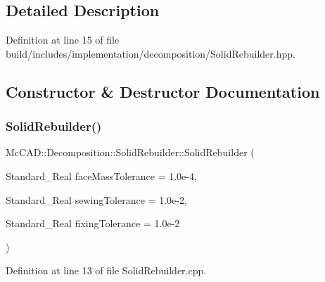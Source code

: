 \subsection{Detailed Description}


Definition at line 15 of file build/includes/implementation/decomposition/\+Solid\+Rebuilder.\+hpp.



\subsection{Constructor \& Destructor Documentation}
\mbox{\label{classMcCAD_1_1Decomposition_1_1SolidRebuilder_a44d8d2538e3297c5c8b843a6e5aa130d}} 
\subsubsection{\texorpdfstring{Solid\+Rebuilder()}{SolidRebuilder()}\hspace{0.1cm}{\footnotesize\ttfamily [1/2]}}
{\footnotesize\ttfamily Mc\+C\+A\+D\+::\+Decomposition\+::\+Solid\+Rebuilder\+::\+Solid\+Rebuilder (\begin{DoxyParamCaption}\item[{Standard\+\_\+\+Real}]{face\+Mass\+Tolerance = {\ttfamily 1.0e-\/4},  }\item[{Standard\+\_\+\+Real}]{sewing\+Tolerance = {\ttfamily 1.0e-\/2},  }\item[{Standard\+\_\+\+Real}]{fixing\+Tolerance = {\ttfamily 1.0e-\/2} }\end{DoxyParamCaption})}



Definition at line 13 of file Solid\+Rebuilder.\+cpp.


